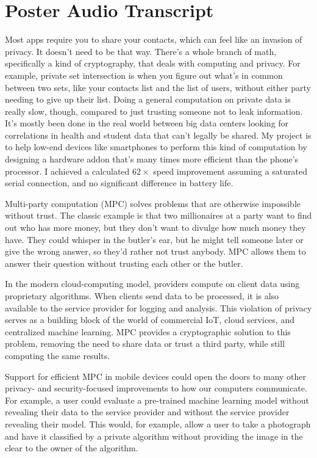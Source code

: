 \documentclass[12pt,letterpaper]{article}
\begin{document}
\pagebreak\pagestyle{plain}

\section{Poster Audio Transcript}
Most apps require you to share your contacts, which can feel like an invasion of privacy. It doesn't need to be that way. There's a whole branch of math, specifically a kind of cryptography, that deals with computing and privacy. For example, private set intersection is when you figure out what's in common between two sets, like your contacts list and the list of users, without either party needing to give up their list. Doing a general computation on private data is really slow, though, compared to just trusting someone not to leak information. It's mostly been done in the real world between big data centers looking for correlations in health and student data that can't legally be shared. My project is to help low-end devices like smartphones to perform this kind of computation by designing a hardware addon that's many times more efficient than the phone's processor. I achieved a calculated $62\times$ speed improvement assuming a saturated serial connection, and no significant difference in battery life.

Multi-party computation (MPC) solves problems that are otherwise impossible without trust. The classic example is that two millionaires at a party want to find out who has more money, but they don't want to divulge how much money they have. They could whisper in the butler's ear, but he might tell someone later or give the wrong answer, so they'd rather not trust anybody. MPC allows them to answer their question without trusting each other or the butler.

In the modern cloud-computing model, providers compute on client data using proprietary algorithms. When clients send data to be processed, it is also available to the service provider for logging and analysis. This violation of privacy serves as a building block of the world of commercial IoT, cloud services, and centralized machine learning. MPC provides a cryptographic solution to this problem, removing the need to share data or trust a third party, while still computing the same results.

Support for efficient MPC in mobile devices could open the doors to many other privacy- and security-focused improvements to how our computers communicate. For example, a user could evaluate a pre-trained machine learning model without revealing their data to the service provider and without the service provider revealing their model. This would, for example, allow a user to take a photograph and have it classified by a private algorithm without providing the image in the clear to the owner of the algorithm.
\end{document}
